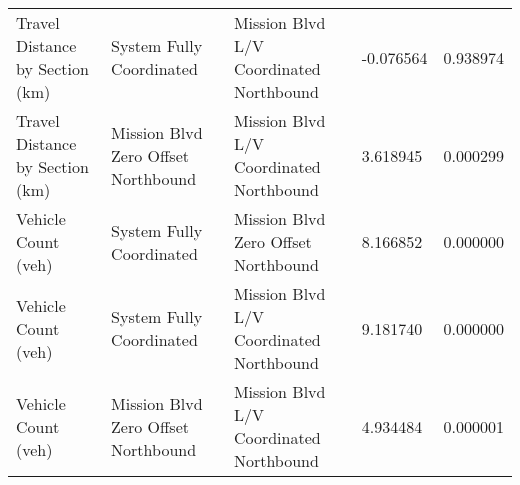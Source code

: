 \begin{tabular}{lllll}
Travel Distance by Section (km) & System Fully Coordinated & Mission Blvd L/V Coordinated Northbound & -0.076564 & 0.938974 \\
Travel Distance by Section (km) & Mission Blvd Zero Offset Northbound & Mission Blvd L/V Coordinated Northbound & 3.618945 & 0.000299 \\
Vehicle Count (veh) & System Fully Coordinated & Mission Blvd Zero Offset Northbound & 8.166852 & 0.000000 \\
Vehicle Count (veh) & System Fully Coordinated & Mission Blvd L/V Coordinated Northbound & 9.181740 & 0.000000 \\
Vehicle Count (veh) & Mission Blvd Zero Offset Northbound & Mission Blvd L/V Coordinated Northbound & 4.934484 & 0.000001 \\
\bottomrule
\end{tabular}

